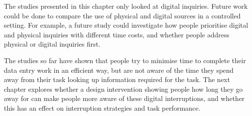 The studies presented in this chapter only looked at digital inquiries. %
Future work could be done to compare the use of physical and digital sources in a controlled setting. For example, a future study could investigate how people prioritise digital and physical inquiries with different time costs, and whether people address physical or digital inquiries first.  

The studies so far have shown that people try to minimise time to complete their data entry work in an efficient way, but are not aware of the time they spend away from their task looking up information required for the task. The next chapter explores whether a design intervention showing people how long they go away for can make people more aware of these digital interruptions, and whether this has an effect on interruption strategies and task performance.
